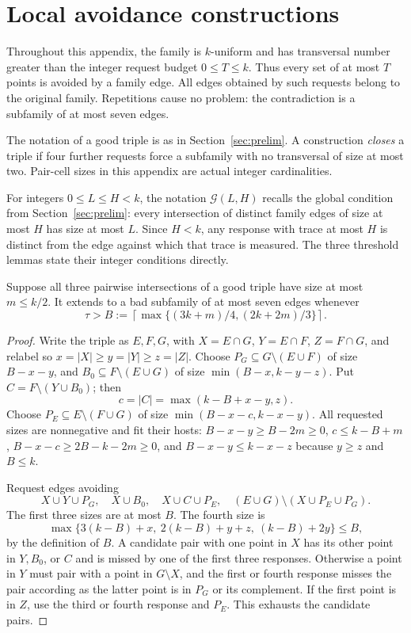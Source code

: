 \section{Local avoidance constructions}\label{app:local}
Throughout this appendix, the family is $k$-uniform and has transversal
number greater than the integer request budget $0\le T\le k$. Thus every set
of at most $T$ points is avoided by a family edge. All edges obtained by
such requests belong to the original family. Repetitions cause no problem:
the contradiction is a subfamily of at most seven edges.

The notation of a good triple is as in Section~\ref{sec:prelim}.
A construction \emph{closes} a triple if four further requests force a
subfamily with no transversal of size at most two. Pair-cell sizes in
this appendix are actual integer cardinalities.

For integers $0\le L\le H<k$, the notation $\mathcal G(L,H)$ recalls
the global condition from Section~\ref{sec:prelim}: every intersection
of distinct family edges of size at most $H$ has size at most $L$.
Since $H<k$, any response with trace at most $H$ is distinct from the
edge against which that trace is measured.
The three threshold lemmas state their integer conditions directly.

\begin{lemma}\label{lem:smalltriple}
Suppose all three pairwise intersections of a good triple have size at most $m\le k/2$. It extends to a bad subfamily of at most seven edges whenever
\[
\tau>B:=\left\lceil\max\{(3k+m)/4,(2k+2m)/3\}\right\rceil.
\]
\end{lemma}
\begin{proof}
Write the triple as $E,F,G$, with $X=E\cap G$, $Y=E\cap F$, $Z=F\cap G$, and relabel so $x=|X|\ge y=|Y|\ge z=|Z|$. Choose $P_G\subseteq G\setminus(E\cup F)$ of size $B-x-y$, and $B_0\subseteq F\setminus(E\cup G)$ of size $\min(B-x,k-y-z)$. Put $C=F\setminus(Y\cup B_0)$; then
\[
c=|C|=\max(k-B+x-y,z).
\]
Choose $P_E\subseteq E\setminus(F\cup G)$ of size $\min(B-x-c,k-x-y)$. All requested sizes are nonnegative and fit their hosts: $B-x-y\ge B-2m\ge0$, $c\le k-B+m$, $B-x-c\ge2B-k-2m\ge0$, and $B-x-y\le k-x-z$ because $y\ge z$ and $B\le k$.

Request edges avoiding
\[
X\cup Y\cup P_G,\quad X\cup B_0,\quad X\cup C\cup P_E,\quad (E\cup G)\setminus(X\cup P_E\cup P_G).
\]
The first three sizes are at most $B$. The fourth size is
\[
\max\{3(k-B)+x,\ 2(k-B)+y+z,\ (k-B)+2y\}\le B,
\]
by the definition of $B$.
A candidate pair with one point in $X$ has its other point in $Y,B_0$, or $C$ and is missed by one of the first three responses. Otherwise a point in $Y$ must pair with a point in $G\setminus X$, and the first or fourth response misses the pair according as the latter point is in $P_G$ or its complement. If the first point is in $Z$, use the third or fourth response and $P_E$. This exhausts the candidate pairs.
\end{proof}

